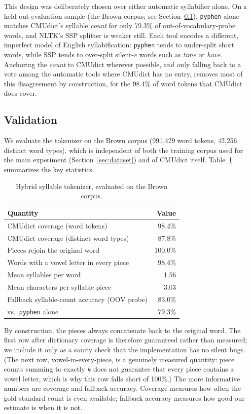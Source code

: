 \documentclass[11pt]{article}
\begin{document}
This design was deliberately chosen over either automatic syllabifier alone. On a held-out evaluation sample (the Brown corpus; see Section~\ref{sec:tokenizer-validation}), \texttt{pyphen} alone matches CMUdict's syllable \emph{count} for only 79.3\% of out-of-vocabulary-probe words, and NLTK's SSP splitter is weaker still. Each tool encodes a different, imperfect model of English syllabification: \texttt{pyphen} tends to under-split short words, while SSP tends to over-split silent-\emph{e} words such as \emph{time} or \emph{have}. Anchoring the \emph{count} to CMUdict wherever possible, and only falling back to a vote among the automatic tools where CMUdict has no entry, removes most of this disagreement by construction, for the 98.4\% of word tokens that CMUdict does cover.

\subsection{Validation}
\label{sec:tokenizer-validation}

We evaluate the tokenizer on the Brown corpus (991{,}429 word tokens, 42{,}256 distinct word types), which is independent of both the training corpus used for the main experiment (Section~\ref{sec:dataset}) and of CMUdict itself. Table~\ref{tab:tokenizer-eval} summarizes the key statistics.

\begin{table}[h]
\centering
\caption{Hybrid syllable tokenizer, evaluated on the Brown corpus.}
\label{tab:tokenizer-eval}
\begin{tabular}{lr}
\toprule
Quantity & Value \\
\midrule
CMUdict coverage (word tokens) & 98.4\% \\
CMUdict coverage (distinct word types) & 87.8\% \\
Pieces rejoin the original word & 100.0\% \\
Words with a vowel letter in every piece & 98.4\% \\
Mean syllables per word & 1.56 \\
Mean characters per syllable piece & 3.03 \\
Fallback syllable-count accuracy (OOV probe) & 83.0\% \\
\quad vs.\ \texttt{pyphen} alone & 79.3\% \\
\bottomrule
\end{tabular}
\end{table}

By construction, the pieces always concatenate back to the original word. The first row after dictionary coverage is therefore guaranteed rather than measured; we include it only as a sanity check that the implementation has no silent bugs. (The next row, vowel-in-every-piece, is a genuinely measured quantity: piece counts summing to exactly $k$ does not guarantee that every piece contains a vowel letter, which is why this row falls short of 100\%.) The more informative numbers are coverage and fallback accuracy. Coverage measures how often the gold-standard count is even available; fallback accuracy measures how good our estimate is when it is not.
\end{document}
